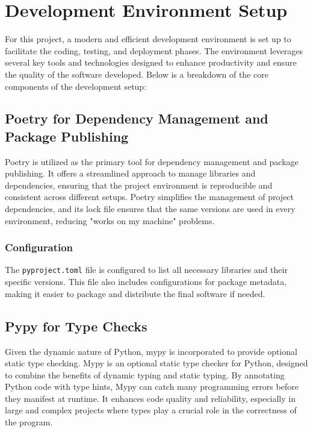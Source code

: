 \section{Development Environment Setup}

For this project, a modern and efficient development environment is set up to facilitate the coding, testing, and deployment phases. The environment leverages several key tools and technologies designed to enhance productivity and ensure the quality of the software developed. Below is a breakdown of the core components of the development setup:

\subsection{Poetry for Dependency Management and Package Publishing}

Poetry\cite{poetry} is utilized as the primary tool for dependency management and package publishing. It offers a streamlined approach to manage libraries and dependencies, ensuring that the project environment is reproducible and consistent across different setups. Poetry simplifies the management of project dependencies, and its lock file ensures that the same versions are used in every environment, reducing "works on my machine" problems.

\subsubsection{Configuration}

The \texttt{pyproject.toml} file is configured to list all necessary libraries and their specific versions. This file also includes configurations for package metadata, making it easier to package and distribute the final software if needed.

\subsection{Pypy for Type Checks}

Given the dynamic nature of Python, mypy\cite{mypy} is incorporated to provide optional static type checking. Mypy is an optional static type checker for Python, designed to combine the benefits of dynamic typing and static typing. By annotating Python code with type hints, Mypy can catch many programming errors before they manifest at runtime. It enhances code quality and reliability, especially in large and complex projects where types play a crucial role in the correctness of the program.

